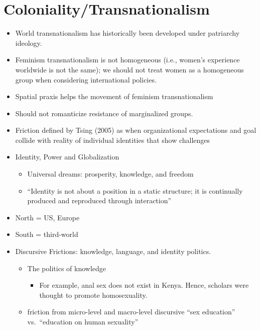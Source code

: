 \documentclass[
]{book}
\providecommand{\tightlist}{%
  \setlength{\itemsep}{0pt}\setlength{\parskip}{0pt}}
\begin{document}
\hypertarget{colonialitytransnationalism}{%
\chapter{Coloniality/Transnationalism}\label{colonialitytransnationalism}}

\citep{dempsey2011}

\begin{itemize}
\item
  World transnationalism has historically been developed under patriarchy ideology.
\item
  Feminism transnationalism is not homogeneous (i.e., women's experience worldwide is not the same); we should not treat women as a homogeneous group when considering international policies.
\item
  Spatial praxis helps the movement of feminism transnationalism
\item
  Should not romanticize resistance of marginalized groups.
\end{itemize}

\citep{Murphy_2013}

\begin{itemize}
\item
  Friction defined by Tsing (2005) as when organizational expectations and goal collide with reality of individual identities that show challenges
\item
  Identity, Power and Globalization

  \begin{itemize}
  \item
    Universal dreams: prosperity, knowledge, and freedom
  \item
    ``Identity is not about a position in a static structure; it is continually produced and reproduced through interaction''
  \end{itemize}
\item
  North = US, Europe
\item
  South = third-world
\item
  Discursive Frictions: knowledge, language, and identity politics.

  \begin{itemize}
  \item
    The politics of knowledge

    \begin{itemize}
    \tightlist
    \item
      For example, anal sex does not exist in Kenya. Hence, scholars were thought to promote homosexuality.
    \end{itemize}
  \item
    friction from micro-level and macro-level discursive ``sex education'' vs.~``education on human sexuality''
  \end{itemize}
\end{itemize}
\end{document}
